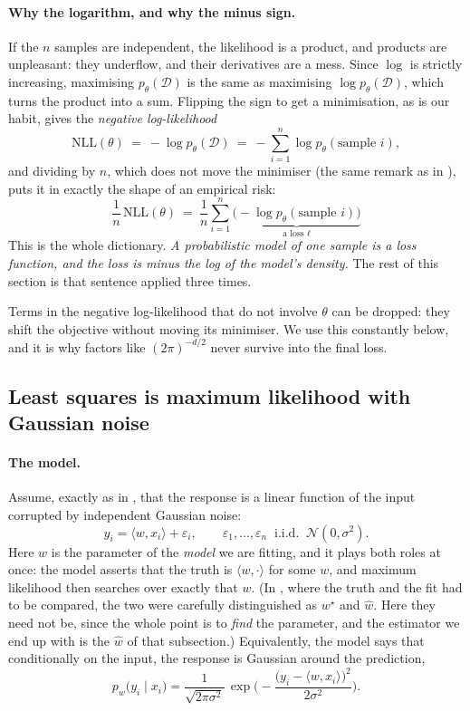 \paragraph{Why the logarithm, and why the minus sign.}
If the $n$ samples are independent, the likelihood is a product, and products are
unpleasant: they underflow, and their derivatives are a mess. Since $\log$ is strictly
increasing, maximising $p_\theta(\mathcal{D})$ is the same as maximising $\log
p_\theta(\mathcal{D})$, which turns the product into a sum. Flipping the sign to get a
minimisation, as is our habit, gives the \emph{negative log-likelihood}
\[
\mathrm{NLL}(\theta) \ = \ - \log p_\theta(\mathcal{D})
\ = \ - \sum_{i=1}^n \log p_\theta(\text{sample } i) ,
\]
and dividing by $n$, which does not move the minimiser (the same remark as in
), puts it in exactly the shape of an empirical risk:
\[
\boxed{\
\frac{1}{n}\, \mathrm{NLL}(\theta)
\ = \ \frac{1}{n} \sum_{i=1}^n \underbrace{\big( - \log p_\theta(\text{sample } i) \big)}_{\text{a loss } \ell}
\ }
\]
This is the whole dictionary. \emph{A probabilistic model of one sample is a loss
function, and the loss is minus the log of the model's density.} The rest of this
section is that sentence applied three times.

\begin{remark}
Terms in the negative log-likelihood that do not involve $\theta$ can be dropped: they
shift the objective without moving its minimiser. We use this constantly below, and it
is why factors like $(2\pi)^{-d/2}$ never survive into the final loss.
\end{remark}


\subsection{Least squares is maximum likelihood with Gaussian noise}
\label{subsec:mle-ls}

\paragraph{The model.}
Assume, exactly as in , that the response is a linear function of
the input corrupted by independent Gaussian noise:
\[
y_i = \langle w, x_i \rangle + \varepsilon_i ,
\qquad
\varepsilon_1, \dots, \varepsilon_n \ \text{ i.i.d. } \ \mathcal{N}(0, \sigma^2) .
\]
Here $w$ is the parameter of the \emph{model} we are fitting, and it plays both roles at
once: the model asserts that the truth is $\langle w, \cdot\rangle$ for some $w$, and
maximum likelihood then searches over exactly that $w$. (In \Cref{subsec:bv-ridge}, where
the truth and the fit had to be compared, the two were carefully distinguished as
$w^\star$ and $\hat w$. Here they need not be, since the whole point is to \emph{find}
the parameter, and the estimator we end up with is the $\hat w$ of that subsection.)
Equivalently, the model says that conditionally on the input, the response is Gaussian
around the prediction,
\[
p_w\big( y_i \mid x_i \big)
= \frac{1}{\sqrt{2\pi\sigma^2}} \, \exp\Big( - \frac{\big( y_i - \langle w, x_i\rangle \big)^2}{2\sigma^2} \Big) .
\]

